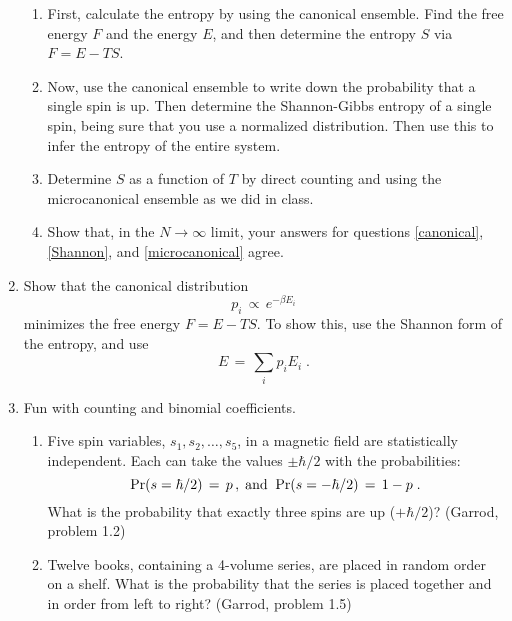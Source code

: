 \begin{enumerate}
\begin{enumerate}
  \item \label{canonical}
  First, calculate the entropy by using the canonical ensemble.
  Find the free energy $F$ and the energy $E$, and then determine the
  entropy $S$ via $F = E - TS$.

  \item \label{Shannon}
  Now, use the canonical ensemble to write down the probability
  that a single spin is up.  Then determine the Shannon-Gibbs entropy
  of a single spin, being sure that you use a normalized
  distribution.  Then use this to infer the entropy of the entire system.

  \item \label{microcanonical}
  Determine $S$ as a function of $T$ by direct counting and
  using the microcanonical ensemble as we did in class.  

  \item Show that, in the $N  \rightarrow \infty$ limit, your answers
  for questions \ref{canonical}, \ref{Shannon}, and
  \ref{microcanonical} agree.  


\end{enumerate}


\item Show that the canonical distribution
\begin{equation}
 p_i \, \propto \, e^{-\beta E_i} 
\end{equation}
minimizes the free energy $F = E - TS$.  To show this, use the Shannon
form of the entropy, and use
\begin{equation}
  E \, = \, \sum_i p_i E_i \;. 
\end{equation}


\item Fun with counting and binomial coefficients.
\begin{enumerate}

\item Five spin variables, $s_1, s_2, \ldots, s_5$, in a magnetic
field are statistically independent.  Each can take the values $\pm
\hbar/2$ with the probabilities:
\begin{equation}
{\rm Pr}(s = \hbar/2) \, = \, p \,,\\\; {\rm and} \;\; 
{\rm Pr}(s = -\hbar/2) \, = \, 1-p \;.
\end{equation}
What is the probability that exactly three spins are up ($+\hbar/2$)?
(Garrod, problem 1.2)

\item Twelve books, containing a 4-volume series, are placed in random
order on a shelf.  What is the probability that the series is placed
together and in order from left to right?  (Garrod, problem 1.5)


\end{enumerate}
\end{enumerate}
